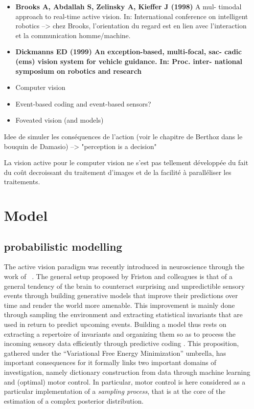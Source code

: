 \documentclass[12pt,twoside,openright]{article}
\begin{document}
{\begin{itemize}
\begin{itemize}
    	\end{itemize}
    	\item  {\bf Brooks A, Abdallah S, Zelinsky A, Kieffer J (1998)} A mul-
    	timodal approach to real-time active vision. In: International
    	conference on intelligent robotics --> chez Brooks, l'orientation du regard est en lien avec l'interaction et la communication homme/machine.
    	\item {\bf Dickmanns ED (1999) An exception-based, multi-focal, sac-
    		cadic (ems) vision system for vehicle guidance. In: Proc. inter-
    		national symposium on robotics and research}
    	\item Computer vision
    	\item Event-based coding and event-based  sensors?
    	\item Foveated vision (and models)
    \end{itemize}	}
    
    
	{\color{green} Idee de simuler les conséquences de l'action (voir le chapitre de Berthoz dans le bouquin de Damasio) --> "perception is a decision"}

	{\color{green} La vision active pour le computer vision ne s'est pas tellement développée du fait du coût decroissant du traitement d'images et de la facilité à paralléliser les traitements.}
	
	\section{Model}
	
	\subsection{probabilistic modelling}

	The active vision paradigm was recently introduced in neuroscience through the work of ~\cite{friston2010free,friston2012perceptions}. %
	The general setup proposed by Friston and colleagues is that of a general tendency of the brain to counteract surprising and unpredictible sensory events through building generative models that improve their predictions over time and render the world more amenable. This improvement is mainly done through sampling the environment and extracting statistical invariants that are used in return to predict upcoming events.
	Building a model thus rests on extracting a repertoire of invariants and organizing them so as to process the incoming sensory data efficiently through predictive coding \cite{rao1999predictive}. This proposition, gathered under the ``Variational Free Energy Minimization'' umbrella, has important consequences for it formally links two important domains of investigation, namely dictionary construction from data through machine learning and (optimal) motor control.
	In particular, motor control is here considered as a particular implementation of a \emph{sampling process}, that is at the core of the estimation of a complex posterior distribution. 
	
\end{document}

